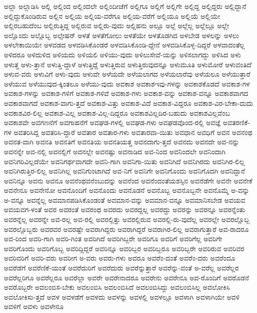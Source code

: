 {ಅಲ್ಲಾ
ಅಲ್ಲಾಡಿಸಿ
ಅಲ್ಲಿ
ಅಲ್ಲಿಂದ
ಅಲ್ಲಿಂದಲೇ
ಅಲ್ಲಿಂದೀಚೆಗೆ
ಅಲ್ಲಿಗೂ
ಅಲ್ಲಿಗೆ
ಅಲ್ಲಿಗೇ
ಅಲ್ಲಿದ್ದ
ಅಲ್ಲಿದ್ದರು
ಅಲ್ಲಿದ್ದಾನೆ
ಅಲ್ಲಿದ್ದುಕೊಂಡಿರುವ
ಅಲ್ಲಿನ
ಅಲ್ಲಿಯ
ಅಲ್ಲಿಯ-ವರೆಗೂ
ಅಲ್ಲಿಯ-ವರೆಗೆ
ಅಲ್ಲಿಯೂ
ಅಲ್ಲಿಯೆ
ಅಲ್ಲಿಯೇ
ಅಲ್ಲಿರಬಹುದೆಂಬ
ಅಲ್ಲಿರುತ್ತಿದ್ದ
ಅಲ್ಲಿರುವ
ಅಲ್ಲಿರು-ವುದು
ಅಲ್ಲಿಹನು
ಅಲ್ಲೂ
ಅಲ್ಲೆ
ಅಲ್ಲೆಲ್ಲ
ಅಲ್ಲೆಲ್ಲೂ
ಅಲ್ಲೇ
ಅಲ್ಲೊಂದು
ಅಲ್ಲೊಬ್ಬ
ಅಲ್ಸೇಷನ್
ಅಳತೆ
ಅಳತೆಗೋಲು
ಅಳತೆಯೇ
ಅಳತೊಡಗಿದ
ಅಳಬೇಡ
ಅಳಲನ್ನು
ಅಳಲು
ಅಳಲೇಕಾಯಿಯೇ
ಅಳವಡದ
ಅಳವಡಿಸಿಕೊಂಡರೆ
ಅಳವಡಿಸಿಕೊಂಡಿ-ದ್ದೇನೆ
ಅಳವಡಿಸಿಕೊಳ್ಳ-ದಿದ್ದರೆ
ಅಳವಾದಂತೆಲ್ಲ
ಅಳಿದರೂ
ಅಳಿದುಳಿದ
ಅಳಿಯದು
ಅಳಿಯಲಿ
ಅಳಿಯು-ವುದು
ಅಳಿಲುಸೇವೆ-ಯನ್ನು
ಅಳಿಸಲಾಗದ್ದು
ಅಳಿಸಿದ
ಅಳು
ಅಳುತ್ತ
ಅಳು-ತ್ತಾನೆ
ಅಳುತ್ತಿ-ದ್ದಾಳೆ
ಅಳುತ್ತಿದ್ದೆ
ಅಳುತ್ತಿರುವ
ಅಳುತ್ತಿರುವುದನ್ನೂ
ಅಳುಮೂತಿ
ಅಳುಮೋರೆ
ಅಳುವಂತಿದೆ
ಅಳುವ-ವರು
ಅಳುವಿಗೆ
ಅಳು-ವುದು
ಅಳುವೇ
ಅಳೆಯದೇ
ಅಳೆಯಲಾಗದ
ಅಳೆಯಲಾರೆವು
ಅಳೆಯಲೂ
ಅಳೆಯುತ್ತಾರೆ
ಅಳೆಯುವ
ಅಳೆಯುವುದ-ಕ್ಕಿಂತಲೂ
ಅಳೆಯು-ವುದು
ಅವಕಾಶ
ಅವಕಾಶಇವು-ಗಳನ್ನು
ಅವಕಾಶಕೊಡದೆ
ಅವಕಾಶ-ಗಳ
ಅವಕಾಶ-ಗಳನ್ನು
ಅವಕಾಶ-ಗಳಿಗೆ
ಅವಕಾಶ-ಗಳಿವೆ
ಅವಕಾಶ-ಗಳು
ಅವಕಾಶ-ವನ್ನು
ಅವಕಾಶ-ವನ್ನೂ
ಅವಕಾಶವಾಗದ
ಅವಕಾಶವಾಗದೆ
ಅವಕಾಶ-ವಾಗು-ತ್ತದೆ
ಅವಕಾಶ-ವಿತ್ತು
ಅವಕಾಶ-ವಿದೆ
ಅವಕಾಶ-ವಿದ್ದರೂ
ಅವಕಾಶ-ವಿರ-ಬೇಕಾ-ದುದು
ಅವಕಾಶವಿರ-ಲಿಲ್ಲ
ಅವಕಾಶ-ವಿಲ್ಲ
ಅವಕಾಶ-ವಿಲ್ಲ-ದಿದ್ದರೂ
ಅವಕಾಶವಿಲ್ಲದಿರ-ಬಹುದು
ಅವಕಾಶವಿಲ್ಲವೆಂಬ
ಅವಕಾಶವೇ
ಅವಗಣನೆಗೆ
ಅವಗಾಹನೆಗೆ
ಅವಘಡ-ಗಳಲ್ಲಿ
ಅವಘಡ-ಗಳು
ಅವಘಡವೊಂದ-ರಲ್ಲಿ
ಅವಜ್ಞೆ
ಅವತರಣಿಕೆ-ಗಳ
ಅವತರಿಸಿದ್ದ
ಅವತರಿಸಿ-ದ್ದಾರೆ
ಅವತಾರ
ಅವತಾರ-ಗಳು
ಅವತಾರವಾ-ಯಿತು
ಅವಧಾನ
ಅವಧಿಗೆ
ಅವನ
ಅವನಂಥ
ಅವನತ-ವಾಗಿ
ಅವನತಿ
ಅವನತಿಗೆ
ಅವನತಿಯ
ಅವನತಿಯತ್ತ
ಅವನದಾಗು-ತ್ತದೆ
ಅವನದು
ಅವನದೇ
ಅವ-ನನ್ನು
ಅವನನ್ನೇ
ಅವ-ನಲ್ಲಿ
ಅವನಲ್ಲಿಗೆ
ಅವನಲ್ಲೇ
ಅವನಷ್ಟು
ಅವನಾಡಿದ
ಅವ-ನಿಂದ
ಅವನಿಂದಲೇ
ಅವನಿಂದಾಗಿ
ಅವನಿಗರಿವಿಲ್ಲದೆಯೇ
ಅವನಿಗರ್ಥವಾಗದೇ
ಅವನಿ-ಗಾಗಿ
ಅವನಿಗಾ-ಯಿತು
ಅವನಿಗಿದೆ
ಅವನಿಗಿರದು
ಅವನಿಗಿರ-ಲಿಲ್ಲ
ಅವನಿಗಿರುತ್ತಿರ-ಲಿಲ್ಲ
ಅವನಿಗಿಲ್ಲ
ಅವನಿಗುಂಟಾಗಿದೆ
ಅವ-ನಿಗೆ
ಅವನಿಗೇ
ಅವನಿಗೊಂದು
ಅವನಿಗೊದಗಿ
ಅವನಿದ್ದಾನೆ
ಅವನಿನ್ನೂ
ಅವನು
ಅವನೂ
ಅವನೆಂಥವನೆಂಬುದನ್ನು
ಅವನೆಂದ
ಅವನೆಂದಂತೆಯಶಸ್ಸಿನ
ಅವನೆಡೆಗೇ
ಅವನೇ
ಅವನೇಕೆ
ಅವನೇನೂ
ಅವನೇನೋ
ಅವನೊಂದಿಗೆ
ಅವನೊಂದು
ಅವನೊಡನೆ
ಅವನೊಬ್ಬ
ಅವನೊಬ್ಬನೇ
ಅವನೊಮ್ಮೆ
ಅ-ವನ್ನು
ಅ-ವನ್ನೂ
ಅವನ್ನೆಲ್ಲ
ಅವಮಾನಪಡಿಸಿಕೊಂಡಂತೆ
ಅವಮಾನ-ವನ್ನು
ಅವಮಾನ-ವನ್ನೂ
ಅವಮಾನಿಸಬೇಡ
ಅವಯವ
ಅವಯವಗ-ಳಂತೆ
ಅವರ
ಅವರಂತೆ
ಅವರಂಥ
ಅವರದು
ಅವರದ್ದಲ್ಲ
ಅವರದ್ದು
ಅವರನ್ನು
ಅವರನ್ನೂ
ಅವರನ್ನೆಂತು
ಅವರನ್ನೆಲ್ಲ
ಅವರನ್ನೇ
ಅವ-ರಲ್ಲ
ಅವ-ರಲ್ಲಿ
ಅವರಲ್ಲಿತ್ತು
ಅವರಲ್ಲಿರುವ
ಅವರಲ್ಲಿ-ರು-ವುದೆಲ್ಲ
ಅವರಲ್ಲೇ
ಅವರಲ್ಲೊಬ್ಬ
ಅವರಲ್ಲೊಬ್ಬರು
ಅವರವರ
ಅವರಷ್ಟೇ
ಅವರಾಗಿದ್ದರು
ಅವರಾಗಿದ್ದರೆ
ಅವರಾಗಿರ-ಲಿಲ್ಲ
ಅವರಾಗುತ್ತಾರೆ
ಅವ-ರಾದರೂ
ಅವ-ರಿಂದ
ಅವರಿ-ಗಾಗಿ
ಅವರಿ-ಗಿಂತ
ಅವರಿಗಿದೆ
ಅವರಿಗಿಬ್ಬರೇ
ಅವರಿಗೂ
ಅವರಿಗೆ
ಅವರಿಗೆಲ್ಲ
ಅವರಿಗೇ
ಅವರಿಗೊಂದು
ಅವರಿಗೊಬ್ಬ
ಅವರಿದ್ದಿದ್ದರೆ
ಅವರಿನ್ನೂ
ಅವರಿಬ್ಬರ
ಅವರಿಬ್ಬರೂ
ಅವರಿಬ್ಬರೇ
ಅವರಿರುವ
ಅವರಿವರ
ಅವರಿವರಿಗೆ
ಅವರಿ-ವರು
ಅವರೀಗ
ಅ-ವರು
ಅವರು-ಗಳು
ಅವರೂ
ಅವರೆಂ-ದಂತೆ
ಅವರೆಂ-ದರು
ಅವರೆಂದೂ
ಅವರೆಡೆಗೆ
ಅವರೆಣಿಕೆ-ಯಂತೆ
ಅವರೆದುರಿಗೆ
ಅವರೆದುರು
ಅವರೆನ್ನುತ್ತಾರೆ
ಅವರೆನ್ನು-ವಂತೆ
ಅ-ವರೆಲ್ಲ
ಅವರೆಲ್ಲರ
ಅವರೆಲ್ಲರಿಗೂ
ಅವರೆಲ್ಲರೂ
ಅವರೆಲ್ಲಾ
ಅವರೇ
ಅವರೇನಾದರೂ
ಅವರೇನು
ಅವರೇನೂ
ಅವ-ರೊಂದಿಗೆ
ಅವರೊಡನೆ
ಅವರೊಬ್ಬರೇ
ಅವಲಂಬಿಸ-ಬೇಕು
ಅವಲಂಬಿಸಿ
ಅವಲಂಬಿಸಿದೆ
ಅವಲಂಬಿಸಿದ್ದು
ಅವಲಂಬಿಸಿಲ್ಲ
ಅವಲೋಕಿಸಿ
ಅವಲೋಕಿಸು-ತ್ತದೆ
ಅವಳ
ಅವಳಡೆಗೆ
ಅವಳದು
ಅವಳನ್ನು
ಅವಳಲ್ಲಿ
ಅವಳಲ್ಲೂ
ಅವಳಾಗಿ
ಅವಳಾಗಿಯೇ
ಅವಳಿ
ಅವಳಿಗೆ
ಅವಳು
ಅವಳೇನೂ
}
